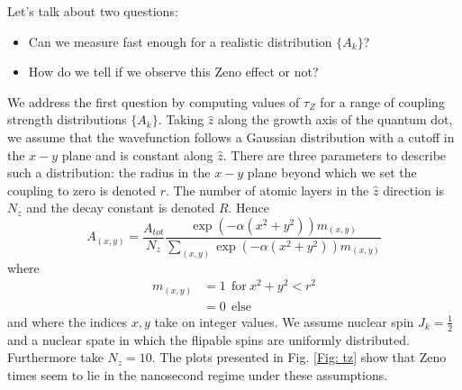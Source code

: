 \documentclass[aps, pra, amsfonts, a4paper, showpacs]{revtex4-1}
\begin{document}
Let's talk about two questions:
\begin{itemize}
\item Can we measure fast enough for a realistic distribution $\{A_k\}$?
\item How do we tell if we observe this Zeno effect or not?
\end{itemize}

We address the first question by computing values of $\tau_Z$ for a range of coupling strength distributions $\{ A_k \}$. Taking $\hat{z}$ along the growth axis of the quantum dot, we assume that the wavefunction follows a Gaussian distribution with a cutoff in the $x-y$ plane and is constant along $\hat{z}$. There are three parameters to describe such a distribution: the radius in the $x-y$ plane beyond which we set the coupling to zero is denoted $r$. The number of atomic layers in the $\hat{z}$ direction is $N_z$ and the decay constant is denoted $R$. Hence
\begin{equation}
A_{(x,y)}=\frac{A_{tot}}{N_z}\frac{\exp(-\alpha(x^2+y^2))m_{(x,y)}}{\sum_{(x,y)}\exp(-\alpha(x^2+y^2))m_{(x,y)}}
\label{Eq: dist}
\end{equation}
where
\[\begin{split}
m_{(x,y)}&= 1\ \  \mathrm{for}\ x^2+y^2<r^2 \\
 &= 0\ \  \mathrm{else}
\end{split}\] and where the indices $x,y$ take on integer values.
We assume nuclear spin $J_k=\frac{1}{2}$ and a nuclear spate in which the flipable spins are uniformly distributed. Furthermore take $N_z=10$.
The plots presented in Fig. \ref{Fig: tz} show that Zeno times seem to lie in the nanosecond regime under these assumptions.
\end{document}
